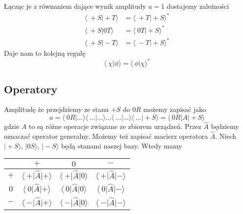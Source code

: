 Łącząc je z równaniem dające wynik amplitudy $a = 1$ dostajemy zależności
\begin{equation*}
	\begin{split}
		\langle\ +S \vert +T \rangle &= \langle\ +T \vert +S \rangle^* \\
		\langle\ +S \vert 0T \rangle &= \langle\ 0T \vert +S \rangle^* \\
		\langle\ +S \vert -T \rangle &= \langle\ -T \vert +S \rangle^* 
	\end{split}
\end{equation*}
Daje nam to kolejną regułę
\begin{equation*}
	\langle\ \chi \vert \phi \rangle = \langle\ \phi \vert \chi \rangle^*
\end{equation*}
\subsection{Operatory}
Amplitudę że przejdziemy ze stanu $+S$ do $0R$ możemy zapisać jako
\begin{equation*}
	a = \langle\ 0R \vert \dots \rangle \langle\ \dots \vert \dots \rangle \dots \langle\ \dots \vert \dots \rangle \langle\ \dots \vert +S \rangle  = \langle\ 0R \vert A \vert +S \rangle 
\end{equation*}
gdzie $A$ to są różne operacje związane ze zbiorem urządzeń. Przez $\hat{A}$ będziemy oznaczać operator generalny.
Możemy też zapisać macierz operatora $\hat{A}$. Niech $\vert +S \rangle$, $\vert 0S \rangle$, $\vert -S \rangle$ będą stanami naszej bazy. Wtedy mamy
\begin{table}[ht]
	\centering
	\begin{tabular}[t]{c|c|c|c}
		& $+$ & $0$ & $-$\\
		\hline
		$+$ & $\langle\ + \vert \hat{A} \vert + \rangle $ & $\langle\ + \vert \hat{A} \vert 0 \rangle $ & $\langle\ + \vert \hat{A} \vert - \rangle $ \\
		\hline
		$0$ & $\langle\ 0 \vert \hat{A} \vert + \rangle $ & $\langle\ 0 \vert \hat{A} \vert 0 \rangle $ & $\langle\ 0 \vert \hat{A} \vert - \rangle $ \\
		\hline
		$-$ & $\langle\ - \vert \hat{A} \vert + \rangle $ & $\langle\ - \vert \hat{A} \vert 0 \rangle $ & $\langle\ - \vert \hat{A} \vert - \rangle $ \\
	\end{tabular}
	\label{tab:macierzoperatora}
\end{table}

